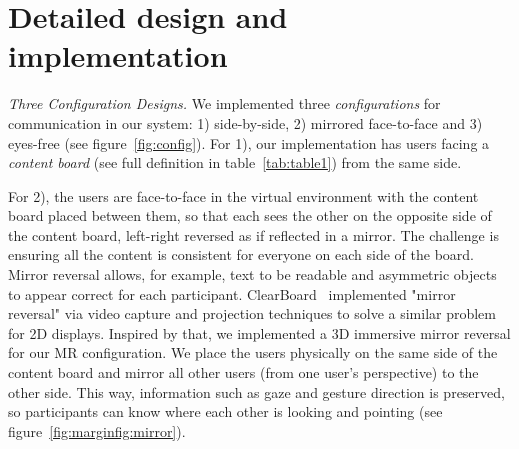 \documentclass[sigchi-a]{acmart}
\begin{document}
\section{Detailed design and implementation}

\textit{Three Configuration Designs.}
We implemented three \textit{configurations} for communication in our system: 1) side-by-side, 2) mirrored face-to-face and 3) eyes-free (see figure~\ref{fig:config}).
For 1), our implementation has users facing a \textit{content board} (see full definition in table~\ref{tab:table1}) from the same side.



For 2), the users are face-to-face in the virtual environment with the content board placed between them, so that each sees the other on the opposite side of the content board, left-right reversed as if reflected in a mirror.
The challenge is ensuring all the content is consistent
for everyone on each side of the board. Mirror reversal allows, for example, text to be readable and asymmetric objects to appear correct for each participant.
ClearBoard~\cite{ishii1993integration} implemented "mirror reversal" via video capture and projection techniques to solve a similar problem for 2D displays. Inspired by that, we implemented a 3D immersive mirror reversal for our MR configuration. We place the users physically
on the same side of the content board and mirror all other users (from one user's perspective) to the other side. This way, information such as gaze and gesture direction is preserved, so participants can know where each other is looking and pointing (see figure~\ref{fig:marginfig:mirror}).
\end{document}
